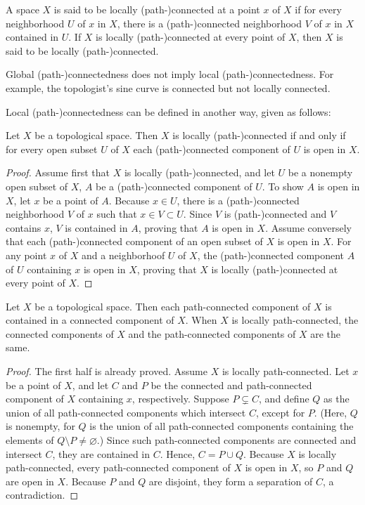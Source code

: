 \begin{defi}
    A space $X$ is said to be locally (path-)connected at a point $x$ of $X$ if for every neighborhood $U$ of $x$ in $X$, there is a (path-)connected neighborhood $V$ of $x$ in $X$ contained in $U$.
    If $X$ is locally (path-)connected at every point of $X$, then $X$ is said to be locally (path-)connected.
\end{defi}
\begin{rmk}
    Global (path-)connectedness does not imply local (path-)connectedness.
    For example, the topologist's sine curve is connected but not locally connected.
\end{rmk}

Local (path-)connectedness can be defined in another way, given as follows:
\begin{prop}
    Let $X$ be a topological space.
    Then $X$ is locally (path-)connected if and only if for every open subset $U$ of $X$ each (path-)connected component of $U$ is open in $X$.
\end{prop}
\begin{proof}
    Assume first that $X$ is locally (path-)connected, and let $U$ be a nonempty open subset of $X$, $A$ be a (path-)connected component of $U$.
    To show $A$ is open in $X$, let $x$ be a point of $A$.
    Because $x\in U$, there is a (path-)connected neighborhood $V$ of $x$ such that $x\in V\subset U$.
    Since $V$ is (path-)connected and $V$ contains $x$, $V$ is contained in $A$, proving that $A$ is open in $X$.
    Assume conversely that each (path-)connected component of an open subset of $X$ is open in $X$.
    For any point $x$ of $X$ and a neighborhoof $U$ of $X$, the (path-)connected component $A$ of $U$ containing $x$ is open in $X$, proving that $X$ is locally (path-)connected at every point of $X$.
\end{proof}

\begin{thm}
    Let $X$ be a topological space.
    Then each path-connected component of $X$ is contained in a connected component of $X$.
    When $X$ is locally path-connected, the connected components of $X$ and the path-connected components of $X$ are the same.
\end{thm}
\begin{proof}
    The first half is already proved.
    Assume $X$ is locally path-connected.
    Let $x$ be a point of $X$, and let $C$ and $P$ be the connected and path-connected component of $X$ containing $x$, respectively.
    Suppose $P\subsetneq C$, and define $Q$ as the union of all path-connected components which intersect $C$, except for $P$. (Here, $Q$ is nonempty, for $Q$ is the union of all path-connected components containing the elements of $Q\setminus P\neq\varnothing$.)
    Since such path-connected components are connected and intersect $C$, they are contained in $C$.
    Hence, $C=P\cup Q$.
    Because $X$ is locally path-connected, every path-connected component of $X$ is open in $X$, so $P$ and $Q$ are open in $X$.
    Because $P$ and $Q$ are disjoint, they form a separation of $C$, a contradiction.
\end{proof}

